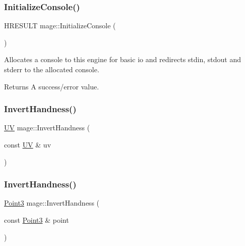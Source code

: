 \subsubsection{\texorpdfstring{Initialize\+Console()}{InitializeConsole()}}
{\footnotesize\ttfamily H\+R\+E\+S\+U\+LT mage\+::\+Initialize\+Console (\begin{DoxyParamCaption}{ }\end{DoxyParamCaption})}

Allocates a console to this engine for basic io and redirects stdin, stdout and stderr to the allocated console.

\begin{DoxyReturn}{Returns}
A success/error value. 
\end{DoxyReturn}
\hypertarget{namespacemage_a13b912f3dcd9c202fe3f9edb424e3b78}{}\label{namespacemage_a13b912f3dcd9c202fe3f9edb424e3b78} 
\subsubsection{\texorpdfstring{Invert\+Handness()}{InvertHandness()}\hspace{0.1cm}{\footnotesize\ttfamily [1/4]}}
{\footnotesize\ttfamily \hyperlink{structmage_1_1_u_v}{UV} mage\+::\+Invert\+Handness (\begin{DoxyParamCaption}\item[{const \hyperlink{structmage_1_1_u_v}{UV} \&}]{uv }\end{DoxyParamCaption})}

\hypertarget{namespacemage_a20ded71f51e2014bab8e7d232eaf1c29}{}\label{namespacemage_a20ded71f51e2014bab8e7d232eaf1c29} 
\subsubsection{\texorpdfstring{Invert\+Handness()}{InvertHandness()}\hspace{0.1cm}{\footnotesize\ttfamily [2/4]}}
{\footnotesize\ttfamily \hyperlink{structmage_1_1_point3}{Point3} mage\+::\+Invert\+Handness (\begin{DoxyParamCaption}\item[{const \hyperlink{structmage_1_1_point3}{Point3} \&}]{point }\end{DoxyParamCaption})}

